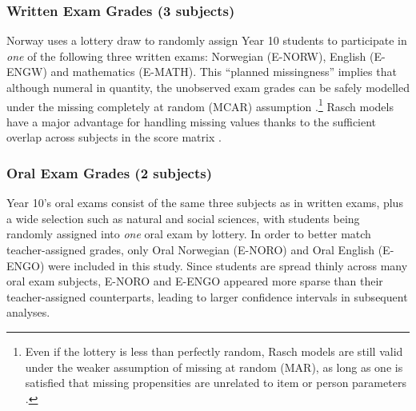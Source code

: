 \subsubsection{Written Exam Grades (3 subjects)}

Norway uses a lottery draw to randomly assign Year 10 students to participate in \emph{one} of the following three written exams: Norwegian (E-NORW), English (E-ENGW) and mathematics (E-MATH). This ``planned missingness'' implies that although numeral in quantity, the unobserved exam grades can be safely modelled under the missing completely at random (MCAR) assumption \parencite{little:2019}.\footnote{Even if the lottery is less than perfectly random, Rasch models are still valid under the weaker assumption of missing at random (MAR), as long as one is satisfied that missing propensities are unrelated to item or person parameters \parencite{molenaar:1995}.} Rasch models have a major advantage for handling missing values thanks to the sufficient overlap across subjects in the score matrix \parencite{he:2018}.

\subsubsection{Oral Exam Grades (2 subjects)}

Year 10's oral exams consist of the same three subjects as in written exams, plus a wide selection such as natural and social sciences, with students being randomly assigned into \emph{one} oral exam by lottery. In order to better match teacher-assigned grades, only Oral Norwegian (E-NORO) and Oral English (E-ENGO) were included in this study. Since students are spread thinly across many oral exam subjects, E-NORO and E-ENGO appeared more sparse than their teacher-assigned counterparts, leading to larger confidence intervals in subsequent analyses.
